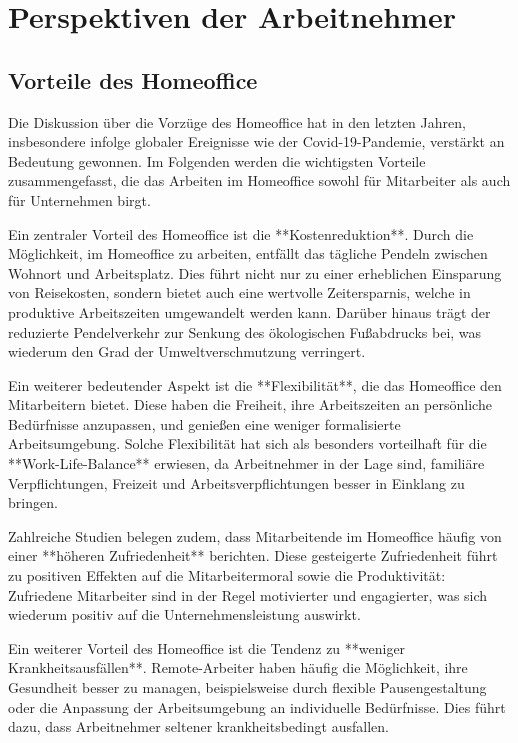 \section{Perspektiven der Arbeitnehmer}

\subsection{Vorteile des Homeoffice}
Die Diskussion über die Vorzüge des Homeoffice hat in den letzten Jahren, insbesondere infolge globaler Ereignisse wie der Covid-19-Pandemie, verstärkt an Bedeutung gewonnen. Im Folgenden werden die wichtigsten Vorteile zusammengefasst, die das Arbeiten im Homeoffice sowohl für Mitarbeiter als auch für Unternehmen birgt.

Ein zentraler Vorteil des Homeoffice ist die **Kostenreduktion**. Durch die Möglichkeit, im Homeoffice zu arbeiten, entfällt das tägliche Pendeln zwischen Wohnort und Arbeitsplatz. Dies führt nicht nur zu einer erheblichen Einsparung von Reisekosten, sondern bietet auch eine wertvolle Zeitersparnis, welche in produktive Arbeitszeiten umgewandelt werden kann. Darüber hinaus trägt der reduzierte Pendelverkehr zur Senkung des ökologischen Fußabdrucks bei, was wiederum den Grad der Umweltverschmutzung verringert\cite{file7}.

Ein weiterer bedeutender Aspekt ist die **Flexibilität**, die das Homeoffice den Mitarbeitern bietet. Diese haben die Freiheit, ihre Arbeitszeiten an persönliche Bedürfnisse anzupassen, und genießen eine weniger formalisierte Arbeitsumgebung. Solche Flexibilität hat sich als besonders vorteilhaft für die **Work-Life-Balance** erwiesen, da Arbeitnehmer in der Lage sind, familiäre Verpflichtungen, Freizeit und Arbeitsverpflichtungen besser in Einklang zu bringen\cite{file4}.

Zahlreiche Studien belegen zudem, dass Mitarbeitende im Homeoffice häufig von einer **höheren Zufriedenheit** berichten. Diese gesteigerte Zufriedenheit führt zu positiven Effekten auf die Mitarbeitermoral sowie die Produktivität: Zufriedene Mitarbeiter sind in der Regel motivierter und engagierter, was sich wiederum positiv auf die Unternehmensleistung auswirkt\cite{file4}.

Ein weiterer Vorteil des Homeoffice ist die Tendenz zu **weniger Krankheitsausfällen**. Remote-Arbeiter haben häufig die Möglichkeit, ihre Gesundheit besser zu managen, beispielsweise durch flexible Pausengestaltung oder die Anpassung der Arbeitsumgebung an individuelle Bedürfnisse. Dies führt dazu, dass Arbeitnehmer seltener krankheitsbedingt ausfallen\cite{file7}.

